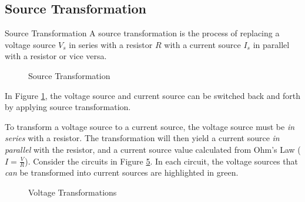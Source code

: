 \documentclass[12pt]{article}
\begin{document}
\subsection{Source Transformation}
\label{ssec:sourceTransformation}

\begin{definition}{Source Transformation}
  A source transformation is the process of replacing a voltage source $V_s$ in series with a resistor $R$ with a current source $I_s$ in parallel with a resistor or vice versa.
\end{definition}

\begin{figure}[H]
  \vspace{-10pt}
  \centering
  
  \caption{Source Transformation}
  \label{fig:014}
  \vspace{-10pt}
\end{figure}

In Figure \ref{fig:014}, the voltage source and current source can be switched back and forth by applying source transformation.

To transform a voltage source to a current source, the voltage source must be \textit{in series} with a resistor. The transformation will then yield a current source \textit{in parallel} with the resistor, and a current source value calculated from Ohm's Law ($I = \frac{V}{R}$). Consider the circuits in Figure \ref{fig:voltageTransformations}. In each circuit, the voltage sources that \textit{can} be transformed into current sources are highlighted in {\color{gr} green}.

\begin{figure}[H]
  \centering
  \begin{subfigure}[H]{0.3\textwidth}
    \centering
    
    \caption{}
    \label{fig:034}
  \end{subfigure}
  \begin{subfigure}[H]{0.3\textwidth}
    \centering
    
    \caption{}
    \label{fig:035}
  \end{subfigure}
  \begin{subfigure}[H]{0.3\textwidth}
    \centering
    
    \caption{}
    \label{fig:036}
  \end{subfigure}
  \caption{Voltage Transformations}
  \label{fig:voltageTransformations}
\end{figure}
\end{document}
